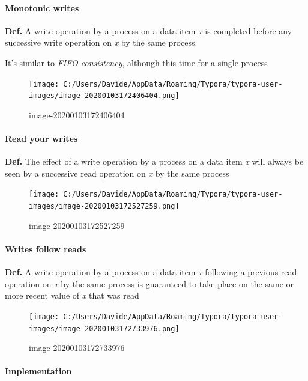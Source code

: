 \paragraph{Monotonic writes}\label{monotonic-writes}

\textbf{Def.} A write operation by a process on a data item \emph{x} is
completed before any successive write operation on \emph{x} by the same
process.

It's similar to \emph{FIFO consistency}, although this time for a single
process

\begin{figure}[htbp]
\centering
\texttt{[image: C:/Users/Davide/AppData/Roaming/Typora/typora-user-images/image-20200103172406404.png]}
\caption{image-20200103172406404}
\end{figure}

\paragraph{Read your writes}\label{read-your-writes}

\textbf{Def.} The effect of a write operation by a process on a data
item \emph{x} will always be seen by a successive read operation on
\emph{x} by the same process

\begin{figure}[htbp]
\centering
\texttt{[image: C:/Users/Davide/AppData/Roaming/Typora/typora-user-images/image-20200103172527259.png]}
\caption{image-20200103172527259}
\end{figure}

\paragraph{Writes follow reads}\label{writes-follow-reads}

\textbf{Def.} A write operation by a process on a data item \emph{x}
following a previous read operation on \emph{x} by the same process is
guaranteed to take place on the same or more recent value of \emph{x}
that was read

\begin{figure}[htbp]
\centering
\texttt{[image: C:/Users/Davide/AppData/Roaming/Typora/typora-user-images/image-20200103172733976.png]}
\caption{image-20200103172733976}
\end{figure}

\paragraph{Implementation}\label{implementation-1}


